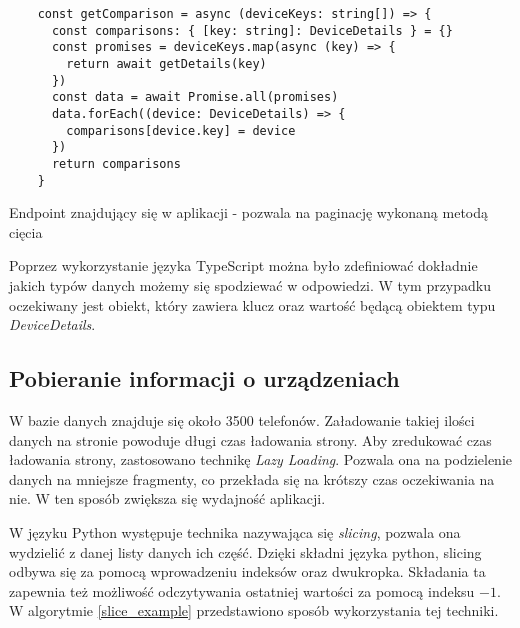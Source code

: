 \begin{code}[H]
  \begin{verbatim}
    const getComparison = async (deviceKeys: string[]) => {
      const comparisons: { [key: string]: DeviceDetails } = {}
      const promises = deviceKeys.map(async (key) => {
        return await getDetails(key)
      })
      const data = await Promise.all(promises)
      data.forEach((device: DeviceDetails) => {
        comparisons[device.key] = device
      })
      return comparisons
    }
  \end{verbatim}
  \caption{Endpoint znajdujący się w aplikacji - pozwala na paginację wykonaną metodą cięcia}
  \label{getting_devices}
\end{code}
Poprzez wykorzystanie języka TypeScript można było zdefiniować dokładnie jakich typów danych możemy się spodziewać w odpowiedzi. W tym przypadku oczekiwany jest obiekt, który zawiera klucz oraz wartość będącą obiektem typu \textit{DeviceDetails}. 

\subsection{Pobieranie informacji o urządzeniach}
W bazie danych znajduje się około 3500 telefonów. Załadowanie takiej ilości danych na stronie powoduje długi czas ładowania strony. Aby zredukować czas ładowania strony, zastosowano technikę \textit{Lazy Loading}. Pozwala ona na podzielenie danych na mniejsze fragmenty, co przekłada się na krótszy czas oczekiwania na nie. W ten sposób zwiększa się wydajność aplikacji.

W języku Python występuje technika nazywająca się \textit{slicing}, pozwala ona wydzielić z danej listy danych ich część. Dzięki składni języka python, slicing odbywa się za pomocą wprowadzeniu indeksów oraz dwukropka. Składania ta zapewnia też możliwość odczytywania ostatniej wartości za pomocą indeksu $-1$. W algorytmie \ref{slice_example} przedstawiono sposób wykorzystania tej techniki.

